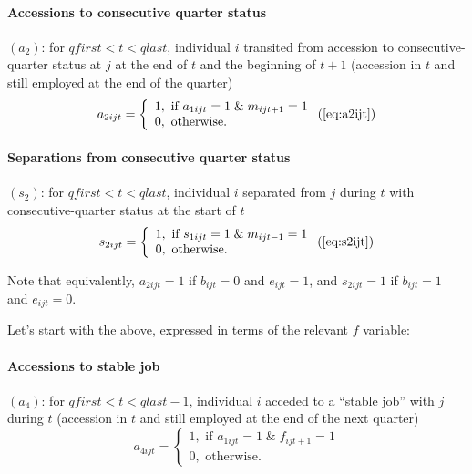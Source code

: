\paragraph{Accessions to consecutive quarter status}


$\left( a_{2}\right) $: for $qfirst<t<qlast$, individual $i$ transited from
accession to consecutive-quarter status at $j$ at the end of $t$ and the
beginning of $t+1$ (accession in $t$ and still employed at the end of the
quarter)%
\begin{equation*}
a_{2ijt}=\left\{ 
\begin{array}{l}
1,\text{ if }a_{1ijt}=1\;\&\;m_{ijt+1}=1 \\ 
0,\text{ otherwise.}%
\end{array}%
\right.  (\ref{eq:a2ijt})
\end{equation*}

\paragraph{Separations from consecutive quarter status}


$\left( s_{2}\right) $: for $qfirst<t<qlast$, individual $i$ separated from $%
j$ during $t$ with consecutive-quarter status at the start of $t$%
\begin{equation*}
s_{2ijt}=\left\{ 
\begin{array}{l}
1,\text{ if }s_{1ijt}=1\;\&\;m_{ijt-1}=1 \\ 
0,\text{ otherwise.}%
\end{array}%
\right.   (\ref{eq:s2ijt})  
\end{equation*}

Note that equivalently, $a_{2ijt}=1$ if $b_{ijt}=0$ and $e_{ijt}=1$, and
$s_{2ijt}=1$ if $b_{ijt}=1$ and $e_{ijt}=0$. 

Let's start with the above, expressed in terms of the relevant $f$
variable:

\paragraph{Accessions to stable job}


$\left( a_{4}\right) $: for $qfirst<t<qlast-1$, individual $i$ acceded to a
``stable job'' with $j$ during $t$  (accession in $t$ and still employed at
the end of the next quarter)%
\begin{equation}
a_{4ijt}=\left\{ 
\begin{array}{l}
1,\text{ if }a_{1ijt}=1\;\&\;f_{ijt+1}=1 \\ 
0,\text{ otherwise.}%
\end{array}%
\right.  
\end{equation}


